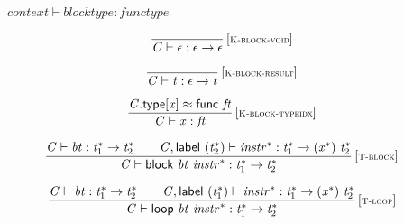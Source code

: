 \vspace{1ex}

$\boxed{{\mathit{context}} \vdash {\mathit{blocktype}} : {\mathit{functype}}}$

$$
\begin{array}{@{}c@{}}\displaystyle
\frac{
}{
{\mathit{C}} \vdash \epsilon : \epsilon \rightarrow \epsilon
} \, {[\textsc{\scriptsize K{-}block{-}void}]}
\qquad
\end{array}
$$

$$
\begin{array}{@{}c@{}}\displaystyle
\frac{
}{
{\mathit{C}} \vdash {\mathit{t}} : \epsilon \rightarrow {\mathit{t}}
} \, {[\textsc{\scriptsize K{-}block{-}result}]}
\qquad
\end{array}
$$

$$
\begin{array}{@{}c@{}}\displaystyle
\frac{
{\mathit{C}}.\mathsf{type}[{\mathit{x}}] \approx \mathsf{func}~{\mathit{ft}}
}{
{\mathit{C}} \vdash {\mathit{x}} : {\mathit{ft}}
} \, {[\textsc{\scriptsize K{-}block{-}typeidx}]}
\qquad
\end{array}
$$

\vspace{1ex}

$$
\begin{array}{@{}c@{}}\displaystyle
\frac{
{\mathit{C}} \vdash {\mathit{bt}} : {{\mathit{t}}_{{1}}^\ast} \rightarrow {{\mathit{t}}_{{2}}^\ast}
 \qquad
{\mathit{C}}, \mathsf{label}~({{\mathit{t}}_{{2}}^\ast}) \vdash {{\mathit{instr}}^\ast} : {{\mathit{t}}_{{1}}^\ast} \rightarrow ({{\mathit{x}}^\ast})~{{\mathit{t}}_{{2}}^\ast}
}{
{\mathit{C}} \vdash \mathsf{block}~{\mathit{bt}}~{{\mathit{instr}}^\ast} : {{\mathit{t}}_{{1}}^\ast} \rightarrow {{\mathit{t}}_{{2}}^\ast}
} \, {[\textsc{\scriptsize T{-}block}]}
\qquad
\end{array}
$$

$$
\begin{array}{@{}c@{}}\displaystyle
\frac{
{\mathit{C}} \vdash {\mathit{bt}} : {{\mathit{t}}_{{1}}^\ast} \rightarrow {{\mathit{t}}_{{2}}^\ast}
 \qquad
{\mathit{C}}, \mathsf{label}~({{\mathit{t}}_{{1}}^\ast}) \vdash {{\mathit{instr}}^\ast} : {{\mathit{t}}_{{1}}^\ast} \rightarrow ({{\mathit{x}}^\ast})~{{\mathit{t}}_{{2}}^\ast}
}{
{\mathit{C}} \vdash \mathsf{loop}~{\mathit{bt}}~{{\mathit{instr}}^\ast} : {{\mathit{t}}_{{1}}^\ast} \rightarrow {{\mathit{t}}_{{2}}^\ast}
} \, {[\textsc{\scriptsize T{-}loop}]}
\qquad
\end{array}
$$

